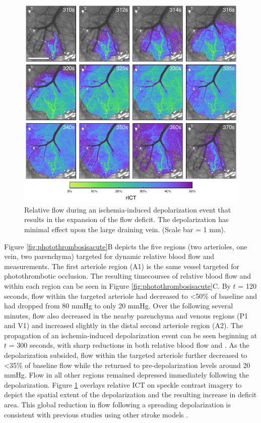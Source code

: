 \begin{figure}
    \includegraphics{figures/chapter_3/pidsequence.pdf}
    \caption{
        \label{fig:pidsequence}
        Relative flow during an ischemia-induced depolarization event that results in the expansion of the flow deficit. The depolarization has minimal effect upon the large draining vein. (Scale bar = 1 mm).
    }
\end{figure}

Figure \ref{fig:photothrombosisacute}B depicts the five regions (two arterioles, one vein, two parenchyma) targeted for dynamic relative blood flow and  measurements. The first arteriole region (A1) is the same vessel targeted for photothrombotic occlusion. The resulting timecourses of relative blood flow and  within each region can be seen in Figure \ref{fig:photothrombosisacute}C. By $t$ = 120 seconds, flow within the targeted arteriole had decreased to \textless50\% of baseline and  had dropped from 80 mmHg to only 20 mmHg. Over the following several minutes, flow also decreased in the nearby parenchyma and venous regions (P1 and V1) and increased slightly in the distal second arteriole region (A2). The propagation of an ischemia-induced depolarization event \cite{Shin:2006dc, Dreier:2011gz} can be seen beginning at $t$ = 300 seconds, with sharp reductions in both relative blood flow and . As the depolarization subsided, flow within the targeted arteriole further decreased to \textless35\% of baseline flow while the  returned to pre-depolarization levels around 20 mmHg. Flow in all other regions remained depressed immediately following the depolarization. Figure \ref{fig:pidsequence} overlays relative ICT on speckle contrast imagery to depict the spatial extent of the depolarization and the resulting increase in deficit area. This global reduction in flow following a spreading depolarization is consistent with previous studies using other stroke models \cite{Shin:2006dc, Nakamura:2010wp}.

